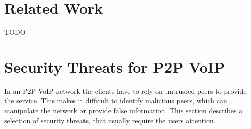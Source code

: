 \documentclass[a4paper,10pt]{article}
\begin{document}
\section{Related Work}
\label{relatedwork}
TODO

\section{Security Threats for P2P VoIP}
\label{p2p}
In an P2P VoIP network the clients have to rely on untrusted peers to provide
the service. This makes it difficult to identify malicious peers, which can
manipulate
the network or provide false information. This section describes a selection of
security threats, that usually require the users attention.
\end{document}
